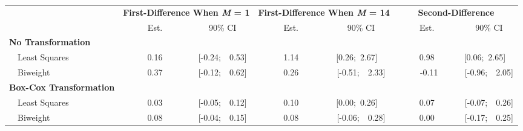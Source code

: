 %
\begin{center}
\begin{tabular}{|l||c|c||c|c||c|c|} \hline
\multicolumn{1}{|l||}{\bf }&\multicolumn{2}{c||}{\bf First-Difference When \textit{M} = 1}&\multicolumn{2}{c||}{\bf First-Difference When \textit{M} = 14}&\multicolumn{2}{c|}{\bf Second-Difference}\\ \cline{2-7}
\multicolumn{1}{|l||}{}&\multicolumn{1}{c|}{Est.}&\multicolumn{1}{c||}{90\% CI}&\multicolumn{1}{c|}{Est.}&\multicolumn{1}{c||}{90\% CI}&\multicolumn{1}{c|}{Est.}&\multicolumn{1}{c|}{90\% CI}\\ \hline
{\bf No Transformation}&&&&&&\\
~~Least Squares&~~~~~0.16~~~~~&[-0.24;~~0.53]&~~~~~1.14~~~~~&[0.26;~2.67]~~&~~~~~0.98~~~~~&[0.06;~2.65]~~\\ 
~~Biweight&~~~~~0.37~~~~~&[-0.12;~~0.62]&~~~~~0.26~~~~~&[-0.51;~~2.33]&~~~~~-0.11~~~~&[-0.96;~~2.05]\\ \hline
{\bf Box-Cox Transformation}&&&&&&\\
~~Least Squares&~~~~~0.03~~~~~&[-0.05;~~0.12]&~~~~~0.10~~~~~&[0.00;~0.26]~~&~~~~~0.07~~~~~&[-0.07;~~0.26]\\ 
~~Biweight&~~~~~0.08~~~~~&[-0.04;~~0.15]&~~~~~0.08~~~~~&[-0.06;~~0.28]&~~~~~0.00~~~~~&[-0.17;~~0.25]\\ 
\hline
\end{tabular}
\end{center}
